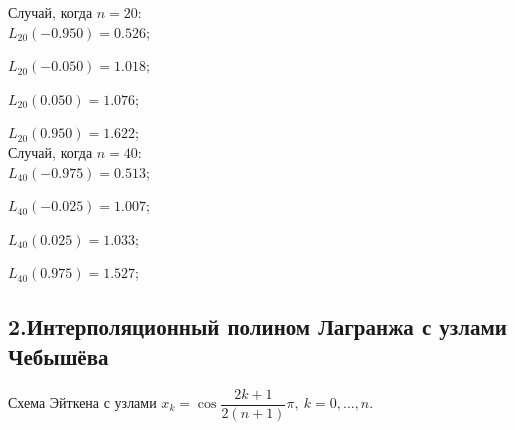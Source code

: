 \documentclass[rus, 12 pt]{article}
\begin{document}
    
    Случай, когда $n=20$:\\

    
    

    
    $L_{20}(-0.950)=0.526$;

    
    $L_{20}(-0.050)=1.018$;

    
    $L_{20}(0.050)=1.076$;

    
    $L_{20}(0.950)=1.622$;\\

    
    

    
    Случай, когда $n=40$:\\

    
    

    
    $L_{40}(-0.975)=0.513$;

    
    $L_{40}(-0.025)=1.007$;

    
    $L_{40}(0.025)=1.033$;

    
    $L_{40}(0.975)=1.527$;\\

    
    

    
    \hypertarget{ux438ux43dux442ux435ux440ux43fux43eux43bux44fux446ux438ux43eux43dux43dux44bux439-ux43fux43eux43bux438ux43dux43eux43c-ux43bux430ux433ux440ux430ux43dux436ux430-ux441-ux443ux437ux43bux430ux43cux438-ux447ux435ux431ux44bux448ux451ux432ux430}{%
\subsection{2.Интерполяционный полином Лагранжа с узлами
Чебышёва}\label{ux438ux43dux442ux435ux440ux43fux43eux43bux44fux446ux438ux43eux43dux43dux44bux439-ux43fux43eux43bux438ux43dux43eux43c-ux43bux430ux433ux440ux430ux43dux436ux430-ux441-ux443ux437ux43bux430ux43cux438-ux447ux435ux431ux44bux448ux451ux432ux430}}

Схема Эйткена с узлами
\(x_k=\cos\dfrac{2k+1}{2(n+1)}\pi,\:k=0,\ldots,n.\)
\end{document}
